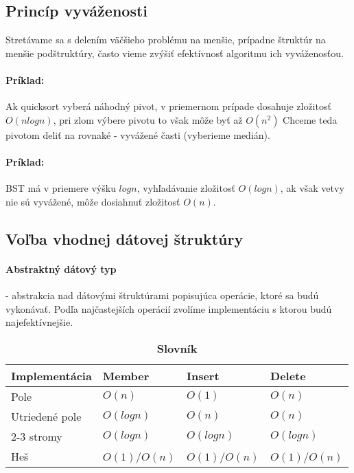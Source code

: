 	\subsection{Princíp vyváženosti}
		Stretávame sa s delením väčšieho problému na menšie, prípadne štruktúr na menšie podštruktúry, často vieme zvýšiť efektívnosť algoritmu ich vyváženosťou.
		\paragraph{Príklad:} Ak quicksort vyberá náhodný pivot, v priemernom prípade dosahuje zložitosť $O(n log n)$, pri zlom výbere pivotu to však môže byť až $O(n^{2})$ Chceme teda pivotom deliť na rovnaké - vyvážené časti (vyberieme medián).\\
		\paragraph{Príklad:} BST má v priemere výšku $log n$, vyhľadávanie zložitosť $O(log n)$, ak však vetvy nie sú vyvážené, môže dosiahnuť zložitosť $O(n)$.
	

	\subsection{Voľba vhodnej dátovej štruktúry}
		\paragraph{Abstraktný dátový typ} - abstrakcia nad dátovými štruktúrami popisujúca operácie, ktoré sa budú vykonávať. Podľa najčastejších operácií zvolíme implementáciu s ktorou budú najefektívnejšie.\\

		\begin{table}[h]
			\centering
			\caption{\textbf{Slovník}}
			\label{my-label}
			\begin{tabular}{|l|l|l|l|}
			\hline
			\textbf{Implementácia} & \textbf{Member} & \textbf{Insert} & \textbf{Delete}  \\ \hline
			Pole                   & $O(n)$            & $O(1)$           & $O(n)$             \\ \hline
			Utriedené pole         & $O(log n)$        & $O(n)$            & $O(n)$             \\ \hline
			2-3 stromy             & $O(log n)$        & $O(log n)$        & $O(log n)$          \\ \hline
			Heš                    & $O(1)$/$O(n)$      & $O(1)$/$O(n)$       & $O(1)$/$O(n)$        \\ \hline
			\end{tabular}
		\end{table}

